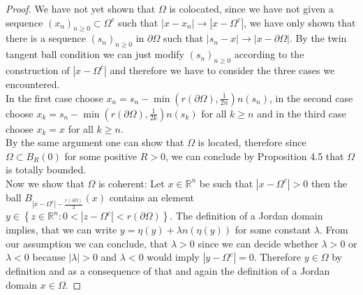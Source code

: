 \documentclass[11pt,a4paper,leqno]{report}
\numberwithin{equation}{chapter}
\begin{document}
\begin{proof}
We have not yet shown that $\Omega$ is colocated, since we have not given a sequence $(x_n)_{n\geq 0}\subset\Omega^c$ such that $|x-x_n|\rightarrow |x-\Omega^c|$, we have only shown that there is a sequence $(s_n)_{n\geq 0}$ in $\partial\Omega$ such that $|s_n-x|\rightarrow |x-\partial\Omega|$. By the twin tangent ball condition we can just modify $(s_n)_{n\geq 0}$ according to the construction of $|x-\Omega^c|$ and therefore we have to consider the three cases we encountered.\\
In the first case choose $x_n=s_n-\min(r(\partial\Omega),\frac{1}{2n})n(s_n)$, in the second case choose $x_k=s_n-\min(r(\partial\Omega),\frac{1}{2k})n(s_k)$ for all $k\geq n$ and in the third case choose $x_k=x$ for all $k\geq n$.\\
By the same argument one can show that $\Omega$ is located, therefore since $\Omega\subset B_R(0)$ for some positive $R>0$, we can conclude by Proposition 4.5 \cite[p. 95]{CANA} that $\Omega$ is totally bounded.\\
Now we show that $\Omega$ is coherent: Let $x\in\mathbb{R}^n$ be such that $|x-\Omega^c|>0$ then the ball $B_{|x-\Omega^c|-\frac{r(\partial\Omega)}{2}}(x)$ contains an element 
\\$y\in\left\{z\in\mathbb{R}^n:0<|z-\Omega^c|<r(\partial\Omega)\right\}$. The definition of a Jordan domain implies, that we can write $y=\eta(y)+\lambda n(\eta(y))$ for some constant $\lambda$. From our assumption we can conclude, that $\lambda>0$ since we can decide whether $\lambda>0$ or $\lambda<0$ because $|\lambda|>0$ and $\lambda<0$ would imply $|y-\Omega^c|=0$.
Therefore $y\in \Omega$ by definition and as a consequence of that and again the definition of a Jordan domain $x\in\Omega$.


\end{proof}
\end{document}

